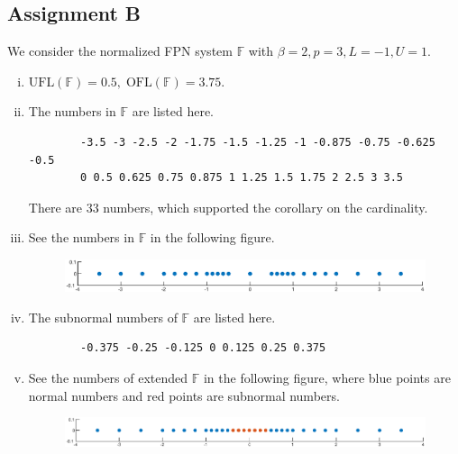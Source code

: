 \documentclass[11pt,en]{elegantpaper}
\begin{document}
\subsection{Assignment B}

We consider the normalized FPN system $\mathbb{F}$ with $\beta=2,p=3,L=-1,U=1$.

\begin{enumerate}[(i)]
    \item $\text{UFL}(\mathbb{F})=0.5,\;\text{OFL}(\mathbb{F})=3.75$.
    \item The numbers in $\mathbb{F}$ are listed here.
    \begin{lstlisting}
        -3.5 -3 -2.5 -2 -1.75 -1.5 -1.25 -1 -0.875 -0.75 -0.625 -0.5 
        0 0.5 0.625 0.75 0.875 1 1.25 1.5 1.75 2 2.5 3 3.5
    \end{lstlisting}
    There are $33$ numbers, which supported the corollary on the cardinality.
    \item See the numbers in $\mathbb{F}$ in the following figure.
    \begin{figure}[H]
        \centering
        \includegraphics[width=\textwidth]{figure/FPN.eps}
    \end{figure}
    \item The subnormal numbers of $\mathbb{F}$ are listed here.
    \begin{lstlisting}
        -0.375 -0.25 -0.125 0 0.125 0.25 0.375
    \end{lstlisting}
    \item See the numbers of extended $\mathbb{F}$ in the following figure, where blue points are normal numbers and red points are subnormal numbers.
    \begin{figure}[H]
        \centering
        \includegraphics[width=\textwidth]{figure/FPNext.eps}
    \end{figure}
\end{enumerate}
\end{document}
